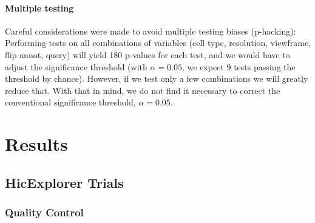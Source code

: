 \documentclass[
  11pt,
  a4paper,
]{scrbook}
\begin{document}
\subsubsection{Multiple testing}\label{multiple-testing}

Careful considerations were made to avoid multiple testing biases
(p-hacking): Performing tests on all combinations of variables (cell
type, resolution, viewframe, flip annot, query) will yield 180 p-values
for each test, and we would have to adjust the significance threshold
(with \(\alpha = 0.05\), we expect 9 tests passing the threshold by
chance). However, if we test only a few combinations we will greatly
reduce that. With that in mind, we do not find it necessary to correct
the conventional significance threshold, \(\alpha=0.05\).

\chapter{Results}\label{results}

\section{HicExplorer Trials}\label{hicexplorer-trials-1}

\subsection{Quality Control}\label{quality-control}
\end{document}
